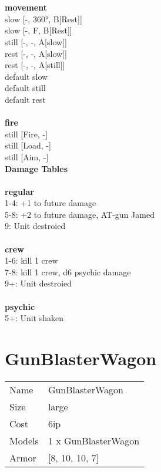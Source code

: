  
\ \\



\ \\ {\bf movement } \\
slow [-, 360°, B[Rest]] \\
slow [-, F, B[Rest]] \\
still [-, -, A[slow]] \\
rest [-, -, A[slow]] \\
rest [-, -, A[still]] \\
default slow \\
default still \\
default rest \\
\ \\ {\bf fire } \\
still [Fire, -] \\
still [Load, -] \\
still [Aim, -] \\


{\bf Damage Tables} \\
\ \\ {\bf regular } \\
1-4: +1 to future damage \\
5-8: +2 to future damage, AT-gun Jamed \\
9: Unit destroied \\
\ \\ {\bf crew } \\
1-6: kill 1 crew \\
7-8: kill 1 crew, d6 psychic damage \\
9+: Unit destroied \\
\ \\ {\bf psychic } \\
5+: Unit shaken \\










\pagebreak\pagebreak

\section{ GunBlasterWagon }

\begin{tabular}{ll}
  Name & GunBlasterWagon \\
  Size & large\\
  Cost & 6ip\\
  Models & 1 x GunBlasterWagon\\
  Armor & [8, 10, 10, 7]\\
\end{tabular}

